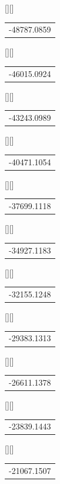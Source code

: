 %    
%
%
\begin{psfrags}%
\psfragscanon%
%
[][]{\color[rgb]{0,0,0}\setlength{\tabcolsep}{0pt}\begin{tabular}{c}-48787.0859\end{tabular}}%
[][]{\color[rgb]{0,0,0}\setlength{\tabcolsep}{0pt}\begin{tabular}{c}-46015.0924\end{tabular}}%
[][]{\color[rgb]{0,0,0}\setlength{\tabcolsep}{0pt}\begin{tabular}{c}-43243.0989\end{tabular}}%
[][]{\color[rgb]{0,0,0}\setlength{\tabcolsep}{0pt}\begin{tabular}{c}-40471.1054\end{tabular}}%
[][]{\color[rgb]{0,0,0}\setlength{\tabcolsep}{0pt}\begin{tabular}{c}-37699.1118\end{tabular}}%
[][]{\color[rgb]{0,0,0}\setlength{\tabcolsep}{0pt}\begin{tabular}{c}-34927.1183\end{tabular}}%
[][]{\color[rgb]{0,0,0}\setlength{\tabcolsep}{0pt}\begin{tabular}{c}-32155.1248\end{tabular}}%
[][]{\color[rgb]{0,0,0}\setlength{\tabcolsep}{0pt}\begin{tabular}{c}-29383.1313\end{tabular}}%
[][]{\color[rgb]{0,0,0}\setlength{\tabcolsep}{0pt}\begin{tabular}{c}-26611.1378\end{tabular}}%
[][]{\color[rgb]{0,0,0}\setlength{\tabcolsep}{0pt}\begin{tabular}{c}-23839.1443\end{tabular}}%
[][]{\color[rgb]{0,0,0}\setlength{\tabcolsep}{0pt}\begin{tabular}{c}-21067.1507\end{tabular}}%

\end{psfrags}
